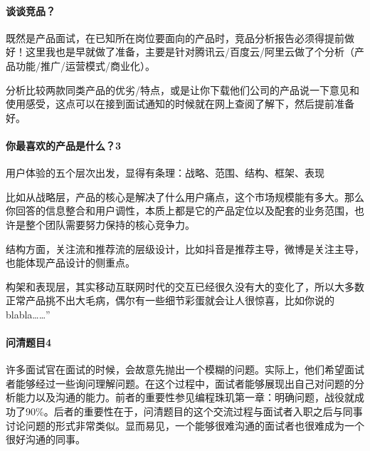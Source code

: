 \documentclass[letterpaper,11pt,english]{sphinxmanual}
\begin{document}
\paragraph{谈谈竞品？}
\label{\detokenize{chapter_interview/question:id13}}
既然是产品面试，在已知所在岗位要面向的产品时，竞品分析报告必须得提前做好！这里我也是早就做了准备，主要是针对腾讯云/百度云/阿里云做了个分析（产品功能/推广/运营模式/商业化）。

分析比较两款同类产品的优劣/特点，或是让你下载他们公司的产品说一下意见和使用感受，这点可以在接到面试通知的时候就在网上查阅了解下，然后提前准备好。
%
\begin{footnote}[798]\sphinxAtStartFootnote
{}
%
\end{footnote}


\paragraph{你最喜欢的产品是什么？3\sphinxfootnotemark[799]}
\label{\detokenize{chapter_interview/question:id14}}%
\begin{footnotetext}[799]\sphinxAtStartFootnote
{}
%
\end{footnotetext}\ignorespaces 
用户体验的五个层次出发，显得有条理：战略、范围、结构、框架、表现

比如从战略层，产品的核心是解决了什么用户痛点，这个市场规模能有多大。那么你回答的信息整合和用户调性，本质上都是它的产品定位以及配套的业务范围，也许是整个团队需要努力保持的核心竞争力。

结构方面，关注流和推荐流的层级设计，比如抖音是推荐主导，微博是关注主导，也能体现产品设计的侧重点。

构架和表现层，其实移动互联网时代的交互已经很久没有大的变化了，所以大多数正常产品挑不出大毛病，偶尔有一些细节彩蛋就会让人很惊喜，比如你说的blabla……”


\paragraph{问清题目4\sphinxfootnotemark[800]}
\label{\detokenize{chapter_interview/question:id15}}%
\begin{footnotetext}[800]\sphinxAtStartFootnote
{}
%
\end{footnotetext}\ignorespaces 
许多面试官在面试的时候，会故意先抛出一个模糊的问题。实际上，他们希望面试者能够经过一些询问理解问题。在这个过程中，面试者能够展现出自己对问题的分析能力以及沟通的能力。前者的重要性参见编程珠玑第一章：明确问题，战役就成功了90\%。后者的重要性在于，问清题目的这个交流过程与面试者入职之后与同事讨论问题的形式非常类似。显而易见，一个能够很难沟通的面试者也很难成为一个很好沟通的同事。
\end{document}
